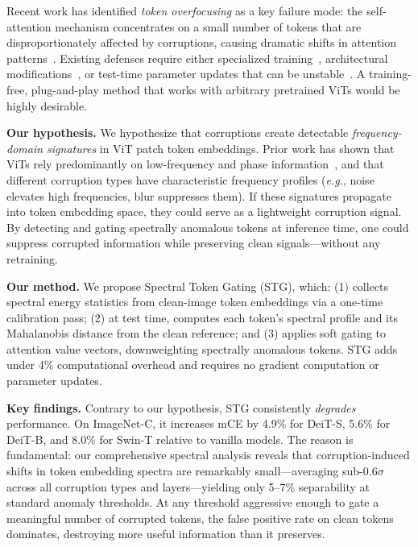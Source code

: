 \documentclass{article}
\newcommand{\methodname}{STG}
\newcommand{\eg}{\emph{e.g.}}
\begin{document}
Recent work has identified \emph{token overfocusing} as a key failure mode: the self-attention mechanism concentrates on a small number of tokens that are disproportionately affected by corruptions, causing dramatic shifts in attention patterns~\citep{guo2023robustifying}. Existing defenses require either specialized training~\citep{zhou2022understanding, guo2023improving, wang2021augmax}, architectural modifications~\citep{zhou2022understanding}, or test-time parameter updates that can be unstable~\citep{wang2021tent}. A training-free, plug-and-play method that works with arbitrary pretrained ViTs would be highly desirable.

\textbf{Our hypothesis.} We hypothesize that corruptions create detectable \emph{frequency-domain signatures} in ViT patch token embeddings. Prior work has shown that ViTs rely predominantly on low-frequency and phase information~\citep{kim2024exploring}, and that different corruption types have characteristic frequency profiles (\eg, noise elevates high frequencies, blur suppresses them). If these signatures propagate into token embedding space, they could serve as a lightweight corruption signal. By detecting and gating spectrally anomalous tokens at inference time, one could suppress corrupted information while preserving clean signals---without any retraining.

\textbf{Our method.} We propose Spectral Token Gating (\methodname{}), which: (1) collects spectral energy statistics from clean-image token embeddings via a one-time calibration pass; (2) at test time, computes each token's spectral profile and its Mahalanobis distance from the clean reference; and (3) applies soft gating to attention value vectors, downweighting spectrally anomalous tokens. \methodname{} adds under 4\% computational overhead and requires no gradient computation or parameter updates.

\textbf{Key findings.} Contrary to our hypothesis, \methodname{} consistently \emph{degrades} performance. On ImageNet-C, it increases mCE by 4.9\% for DeiT-S, 5.6\% for DeiT-B, and 8.0\% for Swin-T relative to vanilla models. The reason is fundamental: our comprehensive spectral analysis reveals that corruption-induced shifts in token embedding spectra are remarkably small---averaging sub-$0.6\sigma$ across all corruption types and layers---yielding only 5--7\% separability at standard anomaly thresholds. At any threshold aggressive enough to gate a meaningful number of corrupted tokens, the false positive rate on clean tokens dominates, destroying more useful information than it preserves.
\end{document}

